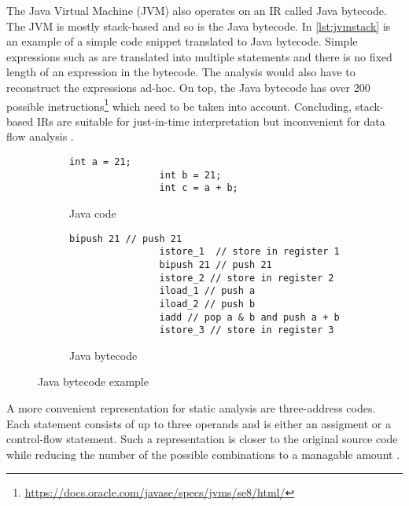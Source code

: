 \documentclass[../draft.tex]{subfiles}
\begin{document}
    The Java Virtual Machine (JVM) also operates on an IR called Java bytecode. The JVM is mostly stack-based and so is the Java bytecode. In \autoref{lst:jvmstack} is an example of a simple code snippet translated to Java bytecode. Simple expressions such as  are translated into multiple statements and there is no fixed length of an expression in the bytecode. The analysis would also have to reconstruct the expressions ad-hoc. On top, the Java bytecode has over 200 possible instructions\footnote{\url{https://docs.oracle.com/javase/specs/jvms/se8/html/}} which need to be taken into account. Concluding, stack-based IRs are suitable for just-in-time interpretation but inconvenient for data flow analysis \cite{Valleerai2004}.

    \begin{figure}[ht]
        \centering
        \begin{subfigure}[b]{0.45\textwidth}
            \centering
            \begin{lstlisting}[gobble=16]
                int a = 21;
                int b = 21;
                int c = a + b;
            \end{lstlisting}
            \caption{Java code}
            \label{lst:jvmstack_a}
        \end{subfigure}
        \hfill
        \begin{subfigure}[b]{0.45\textwidth}
            \centering
            \begin{lstlisting}[gobble=16]
                bipush 21 // push 21
                istore_1  // store in register 1    
                bipush 21 // push 21
                istore_2 // store in register 2
                iload_1 // push a
                iload_2 // push b
                iadd // pop a & b and push a + b
                istore_3 // store in register 3
            \end{lstlisting}
            \caption{Java bytecode}
            \label{lst:jvmstack_b}
        \end{subfigure}
        \caption{Java bytecode example}
        \label{lst:jvmstack}
    \end{figure}

    A more convenient representation for static analysis are three-address codes. Each statement consists of up to three operands and is either an assigment or a control-flow statement. Such a representation is closer to the original source code while reducing the number of the possible combinations to a managable amount \cite{Aho1986}.
\end{document}
